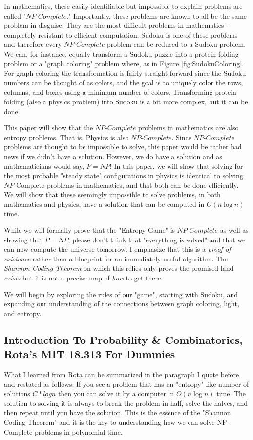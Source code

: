\documentclass{report}
\begin{document}
In mathematics, these easily identifiable but impossible to explain problems are called "$NP\text{-}Complete$."  Importantly, these problems are known to all be the same problem in disguise. They are the most difficult problems in mathematics - completely resistant to efficient computation. Sudoku is one of these problems and therefore every $NP\text{-}Complete$ problem can be reduced to a Sudoku problem. We can, for instance, equally transform a Sudoku puzzle into a protein folding problem or a "graph coloring" problem where, as in Figure \ref{fig:SudokuColoring}. For graph coloring the transformation is fairly straight forward since the Sudoku numbers can be thought of as colors, and the goal is to uniquely color the rows, columns, and boxes using a minimum number of colors. Transforming protein folding (also a physics problem) into Sudoku is a bit more complex, but it can be done.

This paper will show that the $NP\text{-}Complete$ problems in mathematics are also entropy problems. That is, Physics is also $NP\text{-}Complete$. Since $NP\text{-}Complete$ problems are thought to be impossible to solve, this paper would be rather bad news if we didn't have a solution. However, we do have a solution and as mathematicians would say, $P=NP$! In this paper, we will show that solving for the most probable "steady state" configurations in physics is identical to solving \(NP\)-Complete problems in mathematics, and that both can be done efficiently. We will show that these seemingly impossible to solve problems, in both mathematics and physics, have a solution that can be computed in \(O(n \log n)\) time.

While we will formally prove that the "Entropy Game" is $NP\text{-}Complete$ as well as showing that $P=NP$, please don't think that "everything is solved" and that we can now compute the universe tomorrow. I emphasize that this is a \emph{proof of existence} rather than a blueprint for an immediately useful algorithm. The \emph{Shannon Coding Theorem} on which this relies only proves the promised land \emph{exists} but it is not a precise map of \emph{how} to get there.

We will begin by exploring the rules of our "game", starting with Sudoku, and expanding our understanding of the connections between graph coloring, light, and entropy.

\subsection*{Introduction To Probability \& Combinatorics, Rota's MIT 18.313 For Dummies}
What I learned from Rota can be summarized in the paragraph I quote before and restated as follows. If you see a problem that has an "entropy" like number of solutions $C * log n$ then you can solve it by a computer in $O(n \log n)$ time. The solution to solving it is always to break the problem in half, solve the halves, and then repeat until you have the solution. This is the essence of the "Shannon Coding Theorem" and it is the key to understanding how we can solve NP-Complete problems in polynomial time.
\end{document}
